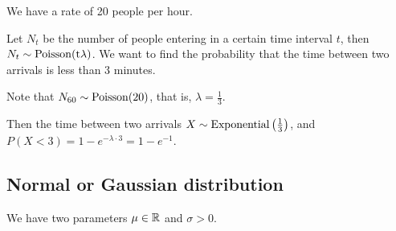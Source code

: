 \documentclass[12pt]{extarticle}
\begin{document}
\begin{example}
    We have a rate of 20 people per hour.

    Let $N_t$ be the number of people entering in a certain time interval $t$, then $N_t \sim \operatorfont{Poisson}(t \lambda)$.
    We want to find the probability that the time between two arrivals is less than 3 minutes.

    Note that $N_{60} \sim \operatorfont{Poisson}(20)$, that is, $\lambda = \frac{1}{3}$.

    Then the time between two arrivals $X \sim \operatorfont{Exponential}\left(\frac{1}{3}\right)$, and $P(X < 3) = 1 - e^{-\lambda \cdot 3} = 1 - e^{-1}$.
\end{example}

\subsection{Normal or Gaussian distribution}

We have two parameters $\mu \in \mathbb{R}$ and $\sigma > 0$.
\end{document}

